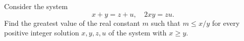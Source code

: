 Consider the system
\[ x + y = z + u, \quad 2xy = zu. \]
Find the greatest value of the real constant $m$ such that $m \leq x/y$ for every positive integer solution $x, y, z, u$ of the system with $x \geq y$.
